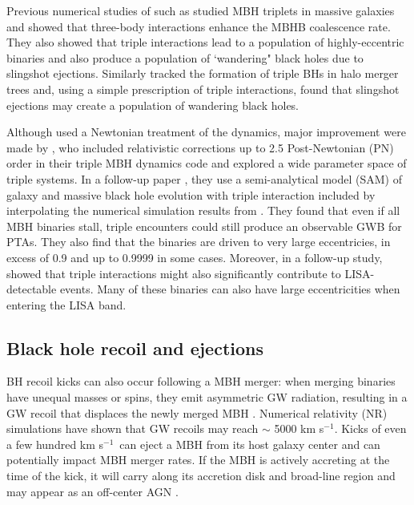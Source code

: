 \documentclass[11pt, letterpaper]{article}
\newcommand{\kms}{km s$^{-1}$}
\begin{document}
Previous numerical studies of such as \citet{hoffman_dynamics_2007} studied MBH triplets in massive galaxies and showed that three-body interactions enhance the MBHB coalescence rate. They also showed that triple interactions lead to a population of highly-eccentric binaries and also produce a population of `wandering" black holes due to slingshot ejections. Similarly \citet{volonteri_assembly_2003} tracked the formation of triple BHs in halo merger trees and, using a simple prescription of triple interactions, found that slingshot ejections may create a population of wandering black holes.


Although \citet{hoffman_dynamics_2007} used a Newtonian treatment of the dynamics, major improvement were made by \citet{bonetti_post-newtonian_2016,bonetti_post-newtonian_2018-1}, who included relativistic corrections up to 2.5 Post-Newtonian (PN) order in their triple MBH dynamics code and
explored a wide parameter space of triple systems. In a follow-up paper \cite{bonetti_post-newtonian_2018}, they use a semi-analytical model (SAM) of galaxy and massive black hole evolution with triple interaction included by interpolating the numerical simulation results from \citet{bonetti_post-newtonian_2018-1}. 
They found that even if all MBH binaries stall, triple encounters could still produce an observable GWB for PTAs. They also find that the binaries are driven to very large eccentricies, in excess of 0.9 and up to 0.9999 in some cases. Moreover, in a follow-up study, \citet{bonetti_post-newtonian_2019} showed that triple interactions might also significantly contribute to LISA-detectable events. Many of these binaries can also have large eccentricities when entering the LISA
band.

\subsection{Black hole recoil and ejections}
\label{sec:BH-recoil}

BH recoil kicks can also occur following a MBH merger: when merging binaries have unequal masses or spins, they emit asymmetric GW 
radiation, resulting in a GW recoil that displaces the newly merged MBH \citep[e.g.,][]{Bekenstein1973, Campanelli_2007}. Numerical relativity (NR) simulations have shown that GW recoils may reach $\sim$ 5000 \kms \citep{Campanelli_2007,lousto_orbital_2011}. Kicks of even a few hundred \kms\ can eject a MBH from its host galaxy center \citep{Lousto_2012, Gerosa_2014, Ricarte2021} and can potentially impact MBH merger rates. If the MBH is actively accreting at the time of the kick, it will carry along its accretion disk and broad-line region and may appear as an off-center AGN \citep{Loeb_2007,blecha_effects_2008, Volonteri_2008, Komossa_2012}. 
\end{document}

